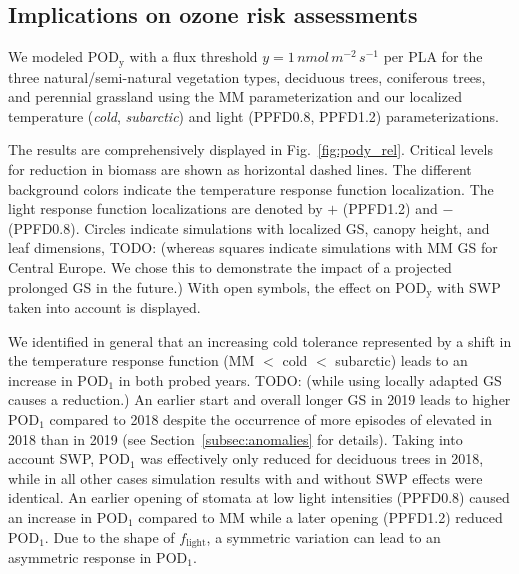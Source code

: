 \documentclass[bg, manuscript]{copernicus}
\begin{document}
\subsection{Implications on ozone risk assessments}
\label{subsec:do3se_results}

We modeled $\mathrm{POD_y}$ with a flux threshold $y=1\,\unit{nmol\,m^{-2}\,s^{-1}}$ per PLA for the three natural/semi-natural vegetation types, deciduous trees, coniferous trees, and perennial grassland using the MM parameterization and our localized temperature (\emph{cold}, \emph{subarctic}) and light (PPFD0.8, PPFD1.2) parameterizations. 

The results are comprehensively displayed in Fig.~\ref{fig:pody_rel}. Critical levels for reduction in biomass \citep[deciduous forest $4\,\unit{\%}$, coniferous forest $2\,\unit{\%}$, and grasslands $10\,\unit{\%}$ biomass reduction adopted from][]{ICP:MappingManual2017,ESPR:Hayes2021} are shown as horizontal dashed lines. The different background colors indicate the temperature response function localization. The light response function localizations are denoted by $+$ (PPFD1.2) and $-$ (PPFD0.8). Circles indicate simulations with localized GS, canopy height, and leaf dimensions, TODO: (whereas squares indicate simulations with MM GS for Central Europe. We chose this to demonstrate the impact of a projected prolonged GS in the future.) With open symbols, the effect on $\mathrm{POD_y}$ with SWP taken into account is displayed.

We identified in general that an increasing cold tolerance represented by a shift in the temperature response function (MM $<$ cold $<$ subarctic) leads to an increase in $\mathrm{POD_1}$ in both probed years. TODO: (while using locally adapted GS causes a reduction.) An earlier start and overall longer GS in 2019 leads to higher $\mathrm{POD_1}$ compared to 2018 despite the occurrence of more episodes of elevated  in 2018 than in 2019 (see Section~\ref{subsec:anomalies} for details). Taking into account SWP, $\mathrm{POD_1}$ was effectively only reduced for deciduous trees in 2018, while in all other cases simulation results with and without SWP effects were identical. An earlier opening of stomata at low light intensities (PPFD0.8) caused an increase in $\mathrm{POD_1}$ compared to MM while a later opening (PPFD1.2) reduced $\mathrm{POD_1}$. Due to the shape of $f_\mathrm{light}$, a symmetric variation can lead to an asymmetric response in $\mathrm{POD_1}$.
\end{document}
